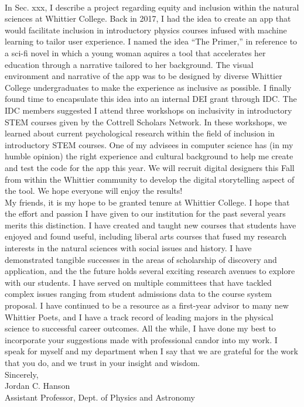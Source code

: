 \documentclass[../../main.tex]{subfiles}
\begin{document}
\\
\vspace{0.25cm}
In Sec. xxx, I describe a project regarding equity and inclusion within the natural sciences at Whittier College.  Back in 2017, I had the idea to create an app that would facilitate inclusion in introductory physics courses infused with machine learning to tailor user experience.  I named the idea ``The Primer,'' in reference to a sci-fi novel in which a young woman aquires a tool that accelerates her education through a narrative tailored to her background.  The visual environment and narrative of the app was to be designed by diverse Whittier College undergraduates to make the experience as inclusive as possible.  I finally found time to encapsulate this idea into an internal DEI grant through IDC.  The IDC members suggested I attend three workshops on inclusivity in introductory STEM courses given by the Cottrell Scholars Network.  In these workshops, we learned about current psychological research within the field of inclusion in introductory STEM courses.  One of my advisees in computer science has (in my humble opinion) the right experience and cultural background to help me create and test the code for the app this year.  We will recruit digital designers this Fall from within the Whittier community to develop the digital storytelling aspect of the tool.  We hope everyone will enjoy the results!
\\
\vspace{0.25cm}
My friends, it is my hope to be granted tenure at Whittier College.  I hope that the effort and passion I have given to our institution for the past several years merits this distinction.  I have created and taught new courses that students have enjoyed and found useful, including liberal arts courses that fused my research interests in the natural sciences with social issues and history.  I have demonstrated tangible successes in the areas of scholarship of discovery and application, and the the future holds several exciting research avenues to explore with our students.  I have served on multiple committees that have tackled complex issues ranging from student admissions data to the course system proposal.  I have continued to be a resource as a first-year advisor to many new Whittier Poets, and I have a track record of leading majors in the physical science to successful career outcomes.  All the while, I have done my best to incorporate your suggestions made with professional candor into my work.  I speak for myself and my department when I say that we are grateful for the work that you do, and we trust in your insight and wisdom.
\\
\vspace{0.25cm}
Sincerely, \\
Jordan C. Hanson \\
Assistant Professor, Dept. of Physics and Astronomy
\end{document}
